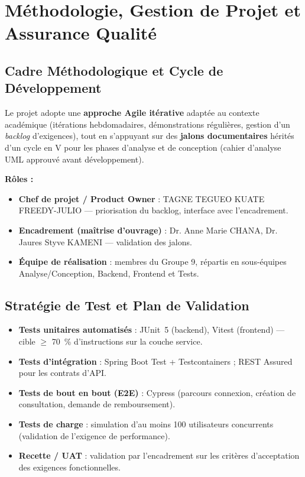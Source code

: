 \documentclass[11pt,a4paper]{article}
\begin{document}
\setcounter{section}{9}
\section{Méthodologie, Gestion de Projet et Assurance Qualité}

\subsection{Cadre Méthodologique et Cycle de Développement}
Le projet adopte une \textbf{approche Agile itérative} adaptée au contexte académique
(itérations hebdomadaires, démonstrations régulières, gestion d'un \emph{backlog}
d'exigences), tout en s'appuyant sur des \textbf{jalons documentaires} hérités d'un
cycle en V pour les phases d'analyse et de conception (cahier d'analyse UML approuvé
avant développement).

\textbf{Rôles :}
\begin{itemize}[leftmargin=1.4em]
  \item \textbf{Chef de projet / Product Owner} : TAGNE TEGUEO KUATE FREEDY-JULIO —
  priorisation du backlog, interface avec l'encadrement.
  \item \textbf{Encadrement (maîtrise d'ouvrage)} : Dr. Anne Marie CHANA,
  Dr. Jaures Styve KAMENI — validation des jalons.
  \item \textbf{Équipe de réalisation} : membres du Groupe 9, répartis en sous-équipes
  Analyse/Conception, Backend, Frontend et Tests.
\end{itemize}

\subsection{Stratégie de Test et Plan de Validation}
\begin{itemize}[leftmargin=1.4em]
  \item \textbf{Tests unitaires automatisés} : JUnit~5 (backend), Vitest (frontend) —
  cible $\geq$ 70~\% d'instructions sur la couche service.
  \item \textbf{Tests d'intégration} : Spring Boot Test + Testcontainers ; REST Assured
  pour les contrats d'API.
  \item \textbf{Tests de bout en bout (E2E)} : Cypress (parcours connexion, création de
  consultation, demande de remboursement).
  \item \textbf{Tests de charge} : simulation d'au moins 100 utilisateurs concurrents
  (validation de l'exigence de performance).
  \item \textbf{Recette / UAT} : validation par l'encadrement sur les critères
  d'acceptation des exigences fonctionnelles.
\end{itemize}
\end{document}
